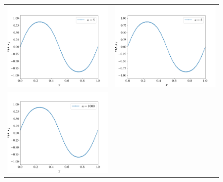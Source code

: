 \documentclass[12pt, reqno]{report}
\theoremstyle{definition}
\theoremstyle{remark}
\begin{document}
\begin{figure}[H]
\begin{tabular}{cc}
        \includegraphics[width = \acfdwidth]{media_paper/stable_AC_CN_5} &
        \includegraphics[width = \acfdwidth]{media_paper/stable_AC_CN_5} \\
        \includegraphics[width = \acfdwidth]{media_paper/stable_AC_CN_1000} &

\end{tabular}
\end{figure}
\end{document}
